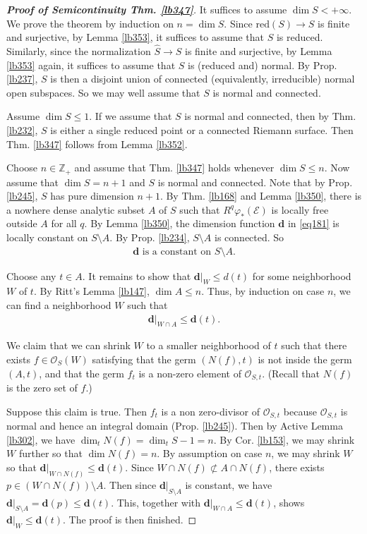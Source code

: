 \documentclass[12pt,b5paper,notitlepage]{report}
\theoremstyle{definition}
\theoremstyle{plain}
\newcommand{\wht}{\widehat}
\newcommand{\scr}{\mathscr}
\newcommand{\mbf}{\mathbf}
\newcommand{\Zbb}{\mathbb Z}
\newcommand{\red}{\mathrm{red}}
\numberwithin{equation}{section}
\begin{document}
\begin{proof}[\textbf{Proof of Semicontinuity Thm. \ref{lb347}}]
It suffices to assume $\dim S<+\infty$. We prove the theorem by induction on $n=\dim S$. Since $\red(S)\rightarrow S$ is finite and surjective, by Lemma \ref{lb353}, it suffices to assume that $S$ is reduced. Similarly, since the normalization $\wht S\rightarrow S$ is finite and surjective, by Lemma \ref{lb353} again, it suffices to assume that $S$ is (reduced and) normal. By Prop. \ref{lb237}, $S$ is then a disjoint union of connected (equivalently, irreducible) normal open subspaces. So we may well assume that $S$ is normal and connected.

Assume $\dim S\leq 1$. If we assume that $S$ is normal and connected, then by Thm. \ref{lb232}, $S$ is either a single reduced point or a connected Riemann surface. Then Thm. \ref{lb347} follows from Lemma \ref{lb352}.

Choose $n\in\Zbb_+$ and assume that Thm. \ref{lb347} holds whenever $\dim S\leq n$. Now assume that $\dim S=n+1$ and $S$ is normal and connected. Note that by Prop. \ref{lb245}, $S$ has pure dimension $n+1$. By Thm. \ref{lb168} and Lemma \ref{lb350}, there is a nowhere dense analytic subset $A$ of $S$ such that $R^q\varphi_*(\scr E)$ is locally free outside $A$ for all $q$. By Lemma \ref{lb350}, the dimension function $\mbf d$ in \eqref{eq181} is locally constant on $S\setminus A$. By Prop. \ref{lb234}, $S\setminus A$ is connected. So 
\begin{align*}
\mbf d\text{ is a constant on }S\setminus A.
\end{align*}


Choose any $t\in A$. It remains to show that $\mbf d|_W\leq d(t)$ for some neighborhood $W$ of $t$. By Ritt's Lemma \ref{lb147}, $\dim A\leq n$. Thus, by induction on case $n$, we can find a neighborhood $W$ such that
\begin{align*}
\mbf d|_{W\cap A}\leq \mbf d(t).
\end{align*}

We claim that we can shrink $W$ to a smaller neighborhood of $t$ such that there exists $f\in\scr O_S(W)$ satisfying that the germ $(N(f),t)$ is not inside the germ $(A,t)$, and that the germ $f_t$ is a non-zero element of $\scr O_{S,t}$. (Recall that $N(f)$ is the zero set of $f$.) 

Suppose this claim is true. Then $f_t$ is a non zero-divisor of $\scr O_{S,t}$ because $\scr O_{S,t}$ is normal and hence an integral domain (Prop. \ref{lb245}). Then by Active Lemma \ref{lb302}, we have $\dim_t N(f)=\dim_t S-1=n$.  By Cor. \ref{lb153}, we may shrink $W$ further so that $\dim N(f)=n$.  By assumption on case $n$, we may shrink $W$ so that $\mbf d|_{W\cap N(f)}\leq \mbf d(t)$. Since $W\cap N(f)\nsubset A\cap N(f)$, there exists $p\in (W\cap N(f))\setminus A$. Then since $\mbf d|_{S\setminus A}$ is constant, we have $\mbf d|_{S\setminus A}=\mbf d(p)\leq \mbf d(t)$. This, together with $\mbf d|_{W\cap A}\leq \mbf d(t)$, shows $\mbf d|_W\leq\mbf d(t)$. The proof is then finished.




\end{proof}
\end{document}
